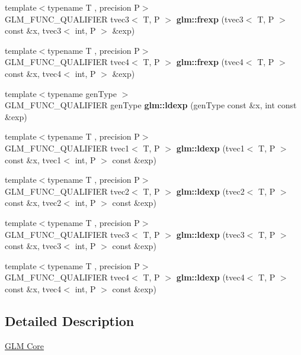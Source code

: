 \begin{DoxyCompactItemize}
\item 
\mbox{\label{func__common_8inl_a2c2633f38fb9ba15eb5af40010b4fd93}} 
{\footnotesize template$<$typename T , precision P$>$ }\\G\+L\+M\+\_\+\+F\+U\+N\+C\+\_\+\+Q\+U\+A\+L\+I\+F\+I\+ER tvec3$<$ T, P $>$ {\bfseries glm\+::frexp} (tvec3$<$ T, P $>$ const \&x, tvec3$<$ int, P $>$ \&exp)
\item 
\mbox{\label{func__common_8inl_a1e479592e7aa1e3e3193de5fdce9a2c1}} 
{\footnotesize template$<$typename T , precision P$>$ }\\G\+L\+M\+\_\+\+F\+U\+N\+C\+\_\+\+Q\+U\+A\+L\+I\+F\+I\+ER tvec4$<$ T, P $>$ {\bfseries glm\+::frexp} (tvec4$<$ T, P $>$ const \&x, tvec4$<$ int, P $>$ \&exp)
\item 
\mbox{\label{func__common_8inl_a2632eefd82cbdf3ca860c41579a5ef9e}} 
{\footnotesize template$<$typename gen\+Type $>$ }\\G\+L\+M\+\_\+\+F\+U\+N\+C\+\_\+\+Q\+U\+A\+L\+I\+F\+I\+ER gen\+Type {\bfseries glm\+::ldexp} (gen\+Type const \&x, int const \&exp)
\item 
\mbox{\label{func__common_8inl_aede23b4113d6d562c9290312af546ffc}} 
{\footnotesize template$<$typename T , precision P$>$ }\\G\+L\+M\+\_\+\+F\+U\+N\+C\+\_\+\+Q\+U\+A\+L\+I\+F\+I\+ER tvec1$<$ T, P $>$ {\bfseries glm\+::ldexp} (tvec1$<$ T, P $>$ const \&x, tvec1$<$ int, P $>$ const \&exp)
\item 
\mbox{\label{func__common_8inl_aaa95b8049903d4a4d7af619c0368a624}} 
{\footnotesize template$<$typename T , precision P$>$ }\\G\+L\+M\+\_\+\+F\+U\+N\+C\+\_\+\+Q\+U\+A\+L\+I\+F\+I\+ER tvec2$<$ T, P $>$ {\bfseries glm\+::ldexp} (tvec2$<$ T, P $>$ const \&x, tvec2$<$ int, P $>$ const \&exp)
\item 
\mbox{\label{func__common_8inl_a991d1c012aefb805ddd6bb97c001553c}} 
{\footnotesize template$<$typename T , precision P$>$ }\\G\+L\+M\+\_\+\+F\+U\+N\+C\+\_\+\+Q\+U\+A\+L\+I\+F\+I\+ER tvec3$<$ T, P $>$ {\bfseries glm\+::ldexp} (tvec3$<$ T, P $>$ const \&x, tvec3$<$ int, P $>$ const \&exp)
\item 
\mbox{\label{func__common_8inl_a50fbbebff2e110062eafca8839cb5d37}} 
{\footnotesize template$<$typename T , precision P$>$ }\\G\+L\+M\+\_\+\+F\+U\+N\+C\+\_\+\+Q\+U\+A\+L\+I\+F\+I\+ER tvec4$<$ T, P $>$ {\bfseries glm\+::ldexp} (tvec4$<$ T, P $>$ const \&x, tvec4$<$ int, P $>$ const \&exp)
\end{DoxyCompactItemize}


\subsection{Detailed Description}
\hyperlink{group__core}{G\+LM Core} 